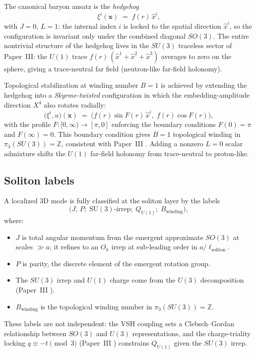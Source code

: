 The canonical baryon ansatz is the \emph{hedgehog}
\begin{equation}
  \xi^i(\mathbf{x}) \;=\; f(r)\,\hat x^i,
  \label{eq:hedgehog}
\end{equation}
with $J=0$, $L=1$: the internal index $i$ is locked to the spatial direction $\hat x^i$, so the
configuration is invariant only under the combined diagonal $SO(3)$.
The entire nontrivial structure of the hedgehog lives in the $SU(3)$ traceless sector of Paper~III:
the $U(1)$ trace $f(r)\,(\hat x^1+\hat x^2+\hat x^3)$ averages to zero on the sphere, giving a
trace-neutral far field (neutron-like far-field holonomy).

Topological stabilization at winding number $B=1$ is achieved by extending the hedgehog into a
\emph{Skyrme-twisted} configuration in which the embedding-amplitude direction $X^4$ also rotates
radially:
\begin{equation}
  \bigl(\xi^i,u\bigr)(\mathbf{x})
  \;=\; \bigl(f(r)\sin F(r)\,\hat x^i,\;f(r)\cos F(r)\bigr),
  \label{eq:skyrme-twist}
\end{equation}
with the profile $F:[0,\infty)\to[\pi,0]$ enforcing the boundary conditions
$F(0)=\pi$ and $F(\infty)=0$.
This boundary condition gives $B=1$ topological winding in $\pi_3(SU(3))=\mathbb{Z}$, consistent
with Paper~III .
Adding a nonzero $L=0$ scalar admixture shifts the $U(1)$ far-field holonomy from trace-neutral
to proton-like.

\subsection{Soliton labels}
\label{subsec:soliton-labels}

A localized 3D mode is fully classified at the soliton layer by the labels
\begin{equation}
  \bigl(J,\,P;\;\mathrm{SU}(3)\text{-irrep};\;Q_{U(1)};\;B_{\mathrm{winding}}\bigr),
  \label{eq:soliton-labels}
\end{equation}
where:
\begin{itemize}
  \item $J$ is total angular momentum from the emergent approximate $SO(3)$ at scales $\gg a$;
  it refines to an $O_h$ irrep at sub-leading order in $a/\ell_{\mathrm{soliton}}$.
  \item $P$ is parity, the discrete element of the emergent rotation group.
  \item The $SU(3)$ irrep and $U(1)$ charge come from the $U(3)$ decomposition (Paper~III
  ).
  \item $B_{\mathrm{winding}}$ is the topological winding number in $\pi_3(SU(3))=\mathbb{Z}$.
\end{itemize}
These labels are not independent: the VSH coupling sets a Clebsch--Gordan relationship between
$SO(3)$ and $U(3)$ representations, and the charge-triality locking $q\equiv -t\pmod{3}$
(Paper~III ) constrains $Q_{U(1)}$ given the $SU(3)$ irrep.


